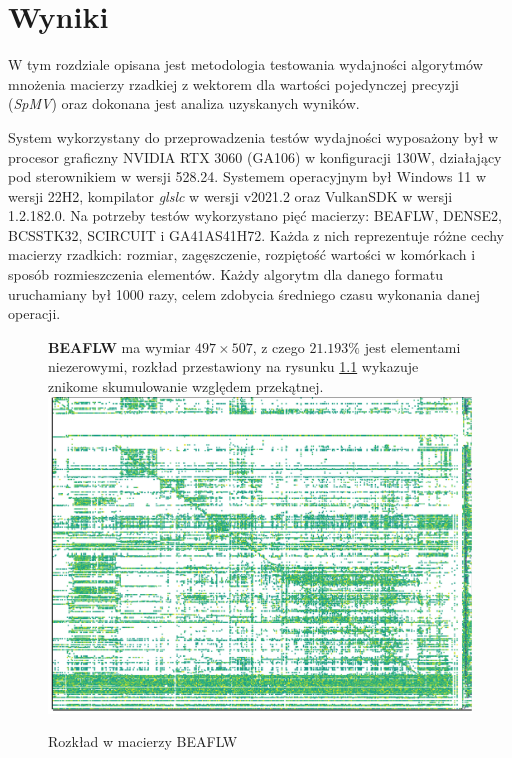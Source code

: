 \chapter{Wyniki}
\label{cha:wyniki}

W tym rozdziale opisana jest metodologia testowania wydajności algorytmów mnożenia macierzy rzadkiej z wektorem dla wartości pojedynczej precyzji (\textit{SpMV}) oraz dokonana jest analiza uzyskanych wyników.

System wykorzystany do przeprowadzenia testów wydajności wyposażony był w procesor graficzny NVIDIA RTX 3060 (GA106) w konfiguracji 130W, działający pod sterownikiem w wersji 528.24.
Systemem operacyjnym był Windows 11 w wersji 22H2, kompilator \textit{glslc} \cite{glslcgithub} w wersji v2021.2 oraz VulkanSDK \cite{vulkansdk} w wersji 1.2.182.0.
Na potrzeby testów wykorzystano pięć macierzy: BEAFLW, DENSE2, BCSSTK32, SCIRCUIT i GA41AS41H72.
Każda z nich reprezentuje różne cechy macierzy rzadkich: rozmiar, zagęszczenie, rozpiętość wartości w komórkach i sposób rozmieszczenia elementów.
Każdy algorytm dla danego formatu uruchamiany był 1000 razy, celem zdobycia średniego czasu wykonania danej operacji.

\begin{figure}[!htb]
    \textbf{BEAFLW} ma wymiar $497 \times 507$, z czego $21.193\%$ jest elementami niezerowymi, rozkład przestawiony na rysunku \ref{beaflw_matrix_plot} wykazuje znikome skumulowanie względem przekątnej.
\endminipage\hfill
{}
  \includegraphics[width=\linewidth]{matrix_plots/beaflw.png}
  \caption{Rozkład w macierzy BEAFLW}\label{beaflw_matrix_plot}
\endminipage\hfill
\end{figure}

